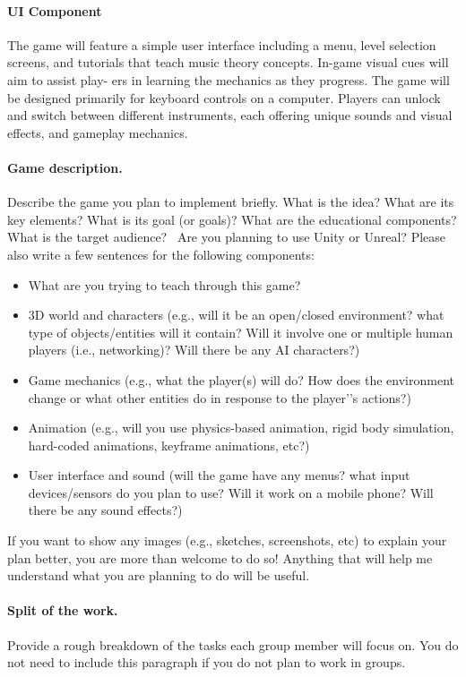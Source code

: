\documentclass[11pt]{article}
\begin{document}
\paragraph*{UI Component}
The game will feature a simple user interface including a menu, level selection
screens, and tutorials that teach music theory concepts. In-game visual cues will aim to assist play-
ers in learning the mechanics as they progress. The game will be designed primarily for keyboard
controls on a computer. Players can unlock and switch between different instruments, each offering
unique sounds and visual effects, and gameplay mechanics.

\newpage

\paragraph*{Game description.}
Describe the game you plan to implement briefly. What is the idea? What are its key elements? What is its goal (or goals)? What are the educational components? What is the target audience?  \ Are you planning to use Unity or Unreal? Please also write a few sentences  for the following components:


\begin{itemize}
\item What are you trying to teach through this game?

\item 3D world and characters (e.g., will it be an open/closed environment? what type of objects/entities will it contain? Will it involve one or multiple human players (i.e., networking)? Will there be any AI characters?)

\item Game mechanics (e.g., what the player(s) will do? How does the environment change or what other entities do in response to the player’'s actions?)

\item Animation (e.g., will you use physics-based animation, rigid body simulation, hard-coded animations, keyframe animations, etc?)
\item User interface and sound (will the game have any menus? what input devices/sensors do you plan to use? Will it work on a mobile phone? Will there be any sound effects?)
\end{itemize}

If you want to show any images (e.g., sketches, screenshots, etc) to explain your plan better, you are more than welcome to do so! Anything that will help me understand what you are planning to do will be useful.  


\paragraph{Split of the work.}
Provide  a rough breakdown of the tasks each group member will focus on. You do not need to include this paragraph if you do not plan to work in groups. 
\end{document}
